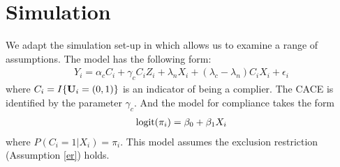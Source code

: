 \documentclass{article}
\begin{document}







\section{Simulation}
We adapt the simulation set-up in \cite{stuart2015assessing} which allows us to examine a range of assumptions. The model has the following form:
\begin{align}
Y_i = \alpha_c C_i + \gamma_cC_iZ_i + \lambda_n X_i + (\lambda_c - \lambda_n)C_iX_i + \epsilon_i
\end{align}
where $C_i = I\{{\bf U}_i = (0, 1)\}$ is an indicator of being a complier. The CACE is identified by the parameter $\gamma_c$. And the model for compliance takes the form
\begin{align}
\mbox{logit}(\pi_i) = \beta_0 + \beta_1X_i
\end{align}
where $P(C_i = 1 | X_i) = \pi_i$. %
This model assumes the exclusion restriction (Assumption \ref{er}) holds.
\end{document}
